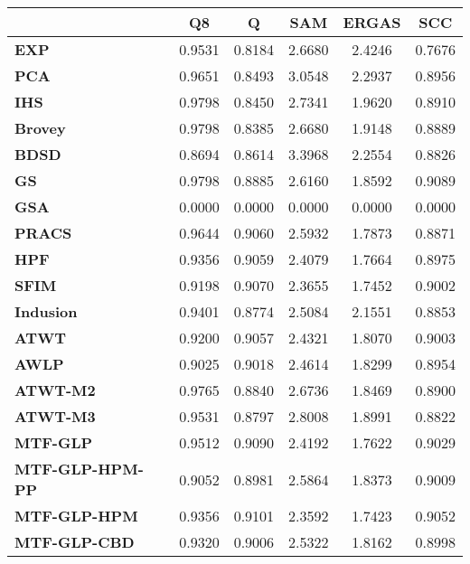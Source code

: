 \begin{tabular}{|l|c|c|c|c|c|}
\hline
&\textbf{Q8}&\textbf{Q}&\textbf{SAM}&\textbf{ERGAS}&\textbf{SCC}\\\hline
\textbf{EXP}&0.9531&0.8184&2.6680&2.4246&0.7676\\\hline
\textbf{PCA}&0.9651&0.8493&3.0548&2.2937&0.8956\\\hline
\textbf{IHS}&0.9798&0.8450&2.7341&1.9620&0.8910\\\hline
\textbf{Brovey}&0.9798&0.8385&2.6680&1.9148&0.8889\\\hline
\textbf{BDSD}&0.8694&0.8614&3.3968&2.2554&0.8826\\\hline
\textbf{GS}&0.9798&0.8885&2.6160&1.8592&0.9089\\\hline
\textbf{GSA}&0.0000&0.0000&0.0000&0.0000&0.0000\\\hline
\textbf{PRACS}&0.9644&0.9060&2.5932&1.7873&0.8871\\\hline
\textbf{HPF}&0.9356&0.9059&2.4079&1.7664&0.8975\\\hline
\textbf{SFIM}&0.9198&0.9070&2.3655&1.7452&0.9002\\\hline
\textbf{Indusion}&0.9401&0.8774&2.5084&2.1551&0.8853\\\hline
\textbf{ATWT}&0.9200&0.9057&2.4321&1.8070&0.9003\\\hline
\textbf{AWLP}&0.9025&0.9018&2.4614&1.8299&0.8954\\\hline
\textbf{ATWT-M2}&0.9765&0.8840&2.6736&1.8469&0.8900\\\hline
\textbf{ATWT-M3}&0.9531&0.8797&2.8008&1.8991&0.8822\\\hline
\textbf{MTF-GLP}&0.9512&0.9090&2.4192&1.7622&0.9029\\\hline
\textbf{MTF-GLP-HPM-PP}&0.9052&0.8981&2.5864&1.8373&0.9009\\\hline
\textbf{MTF-GLP-HPM}&0.9356&0.9101&2.3592&1.7423&0.9052\\\hline
\textbf{MTF-GLP-CBD}&0.9320&0.9006&2.5322&1.8162&0.8998\\\hline
\end{tabular}

